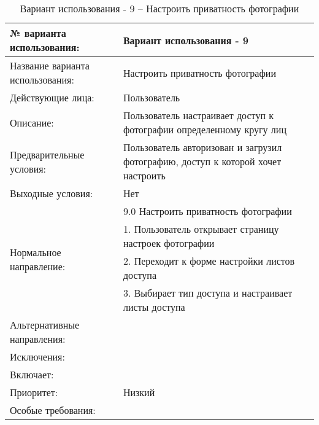 \begin{table}[H]
  \caption{Вариант использования - 9 – Настроить приватность фотографии}\label{use-case-9-table}
  \begin{tabular}{|p{6cm}|p{10cm}|}
  \hline № варианта использования: & Вариант использования - 9 \\
  \hline Название варианта использования: & Настроить приватность фотографии \\
  \hline Действующие лица: & Пользователь \\
  \hline Описание: & Пользователь настраивает доступ к фотографии определенному кругу лиц \\
  \hline Предварительные условия: & Пользователь авторизован и загрузил фотографию, доступ к которой хочет настроить \\
  \hline Выходные условия: & Нет \\
  \hline \multirow{4}{*}{Нормальное направление:} & 9.0 Настроить приватность фотографии \\
  \cline{2-2} & 1. Пользователь открывает страницу настроек фотографии \\
  \cline{2-2} & 2. Переходит к форме настройки листов доступа \\
  \cline{2-2} & 3. Выбирает тип доступа и настраивает листы доступа \\
  \hline Альтернативные направления: &  \\
  \hline Исключения: &  \\
  \hline Включает: &  \\
  \hline Приоритет: & Низкий \\
  \hline Особые требования: &  \\
  \hline 
  \end{tabular}
\end{table}

